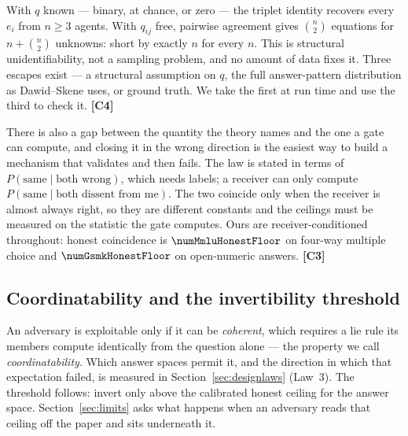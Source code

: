 With $q$ known --- binary, at chance, or zero --- the triplet identity recovers
every $e_i$ from $n\geq3$ agents. With $q_{ij}$ free, pairwise agreement gives
$\binom{n}{2}$ equations for $n+\binom{n}{2}$ unknowns: short by exactly $n$ for
every $n$. This is structural unidentifiability, not a sampling problem, and no
amount of data fixes it. Three escapes exist --- a structural assumption on $q$,
the full answer-pattern distribution as Dawid--Skene uses, or ground truth. We
take the first at run time and use the third to check it. \textbf{[C4]}

There is also a gap between the quantity the theory names and the one a gate can
compute, and closing it in the wrong direction is the easiest way to build a
mechanism that validates and then fails. The law is stated in terms of
$P(\text{same}\mid\text{both wrong})$, which needs labels; a receiver can only
compute $P(\text{same}\mid\text{both dissent from me})$. The two coincide only
when the receiver is almost always right, so they are different constants and the
ceilings must be measured on the statistic the gate computes. Ours are
receiver-conditioned throughout: honest coincidence is $\numMmluHonestFloor$ on
four-way multiple choice and $\numGsmkHonestFloor$ on open-numeric answers.
\textbf{[C3]}

\subsection{Coordinatability and the invertibility threshold}

An adversary is exploitable only if it can be \emph{coherent}, which requires a
lie rule its members compute identically from the question alone --- the property
we call \emph{coordinatability}. Which answer spaces permit it, and the direction
in which that expectation failed, is measured in Section~\ref{sec:designlaws}
(Law~3). The threshold follows: invert only above the calibrated honest ceiling
for the answer space. Section~\ref{sec:limits} asks what happens when an
adversary reads that ceiling off the paper and sits underneath it.
